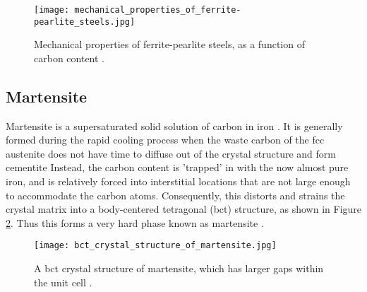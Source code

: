 \begin{figure}[H]
    \centering
    \texttt{[image: mechanical\_properties\_of\_ferrite-pearlite\_steels.jpg]}
    \caption{Mechanical properties of ferrite-pearlite steels, as a function of carbon content \cite{molabe2018determining}. }
    \label{ch3:figure:properties}
\end{figure}

\subsection{Martensite}
Martensite is a supersaturated solid solution of carbon in iron \cite{molabe2018determining}. It is generally formed during the rapid cooling process when the waste carbon of the fcc austenite does not have time to diffuse out of the crystal structure and form cementite \cite{bajaj2020steels} Instead, the carbon content is 'trapped' in with the now almost pure iron, and is relatively forced into interstitial locations that are not large enough to accommodate the carbon atoms. Consequently, this distorts and strains the crystal matrix into a body-centered tetragonal (bct) structure, as shown in Figure \ref{ch3:figure:martensite}. Thus this forms a very hard phase known as martensite \cite{molabe2018determining}.
 
\begin{figure}[H]
    \centering
    \texttt{[image: bct\_crystal\_structure\_of\_martensite.jpg]}
    \caption{A bct crystal structure of martensite, which has larger gaps within the unit cell \cite{bajaj2020steels}.}
    \label{ch3:figure:martensite}
\end{figure}


